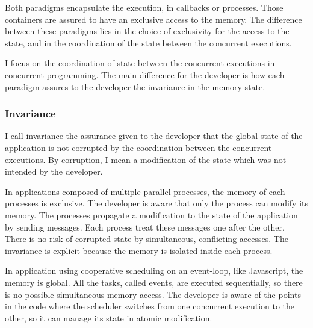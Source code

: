 Both paradigms encapsulate the execution, in callbacks or processes.
Those containers are assured to have an exclusive access to the memory.
The difference between these paradigms lies in the choice of exclusivity for the access to the state, and in the coordination of the state between the concurrent executions.

I focus on the coordination of state between the concurrent executions in concurrent programming.
The main difference for the developer is how each paradigm assures to the developer the invariance in the memory state.


\subsubsection{Invariance}

I call invariance the assurance given to the developer that the global state of the application is not corrupted by the coordination between the concurrent executions.
By corruption, I mean a modification of the state which was not intended by the developer.

In applications composed of multiple parallel processes, the memory of each processes is exclusive.
The developer is aware that only the process can modify its memory.
The processes propagate a modification to the state of the application by sending messages.
Each process treat these messages one after the other.
There is no risk of corrupted state by simultaneous, conflicting accesses.
The invariance is explicit because the memory is isolated inside each process.

In application using cooperative scheduling on an event-loop, like Javascript, the memory is global.
All the tasks, called events, are executed sequentially, so there is no possible simultaneous memory access.
The developer is aware of the points in the code where the scheduler switches from one concurrent execution to the other, so it can manage its state in atomic modification.

